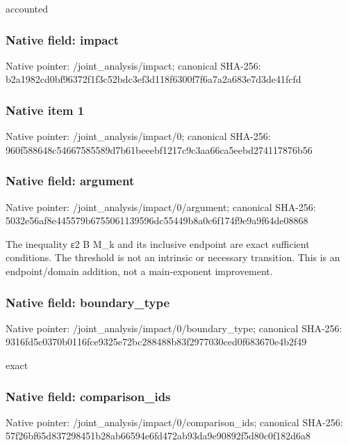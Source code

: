 \documentclass[10pt,a4paper]{article}
\begin{document}
\begingroup\raggedright\sloppy accounted\par\endgroup

\subsubsection{Native field: impact}
Native pointer: /joint\_\allowbreak{}analysis/impact; canonical SHA-256: b2a1982cd0bf96372f1f3c52bdc3ef3d118f6300f7f6a7a2a683e7d3de41fcfd

\subsubsection{Native item 1}
Native pointer: /joint\_\allowbreak{}analysis/impact/0; canonical SHA-256: 960f588648c54667585589d7b61beeebf1217c9c3aa66ca5eebd274117876b56

\subsubsection{Native field: argument}
Native pointer: /joint\_\allowbreak{}analysis/impact/0/argument; canonical SHA-256: 5032e56af8e445579b6755061139596dc55449b8a0c6f174f9e9a9f64de08868

\begingroup\raggedright\sloppy The inequality {\AtlasUnicodeText ε}\allowbreak{}2 B M\_\allowbreak{}k and its inclusive endpoint are exact sufficient conditions. The threshold is not an intrinsic or necessary transition. This is an endpoint/\allowbreak{}domain addition,\allowbreak{} not a main-exponent improvement.\par\endgroup

\subsubsection{Native field: boundary\_\allowbreak{}type}
Native pointer: /joint\_\allowbreak{}analysis/impact/0/boundary\_\allowbreak{}type; canonical SHA-256: 9316fd5c0370b0116fce9325e72bc288488b83f2977030ced0f683670e4b2f49

\begingroup\raggedright\sloppy exact\par\endgroup

\subsubsection{Native field: comparison\_\allowbreak{}ids}
Native pointer: /joint\_\allowbreak{}analysis/impact/0/comparison\_\allowbreak{}ids; canonical SHA-256: 57f26bf65d837298451b28ab66594e6fd472ab93da9e90892f5d80c0f182d6a8
\end{document}
